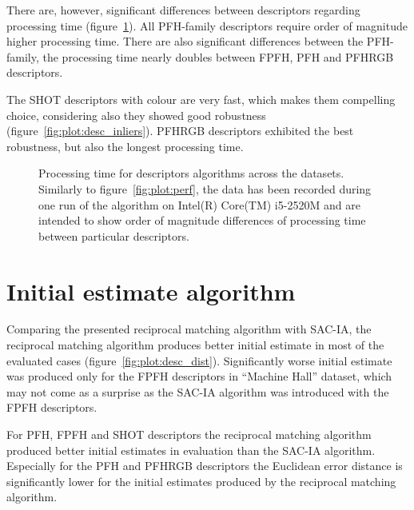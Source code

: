 There are, however, significant differences between descriptors regarding processing time (figure~\ref{fig:plot:desc_perf}). All \gls{PFH}-family descriptors require order of magnitude higher processing time. There are also significant differences between the \gls{PFH}-family, the processing time nearly doubles between \gls{FPFH}, \gls{PFH} and \gls{PFHRGB} descriptors.

The \gls{SHOT} descriptors with colour are very fast, which makes them compelling choice, considering also they showed good robustness (figure~\ref{fig:plot:desc_inliers}). \gls{PFHRGB} descriptors exhibited the best robustness, but also the longest processing time.

\begin{figure}
  \centering
  
  \caption[Processing time per descriptors]{Processing time for descriptors algorithms across the datasets. Similarly to figure~\ref{fig:plot:perf}, the data has been recorded during one run of the algorithm on Intel(R) Core(TM) i5-2520M and are intended to show order of magnitude differences of processing time between particular descriptors.}
  \label{fig:plot:desc_perf}
\end{figure}

\section{Initial estimate algorithm}

Comparing the presented reciprocal matching algorithm with \gls{SAC-IA}, the reciprocal matching algorithm produces better initial estimate in most of the evaluated cases (figure~\ref{fig:plot:desc_dist}). Significantly worse initial estimate was produced only for the \gls{FPFH} descriptors in ``Machine Hall'' dataset, which may not come as a surprise as the \gls{SAC-IA} algorithm was introduced with the \gls{FPFH} descriptors.

For \gls{PFH}, \gls{FPFH} and \gls{SHOT} descriptors the reciprocal matching algorithm produced better initial estimates in evaluation than the \gls{SAC-IA} algorithm. Especially for the \gls{PFH} and \gls{PFHRGB} descriptors the Euclidean error distance is significantly lower for the initial estimates produced by the reciprocal matching algorithm.
